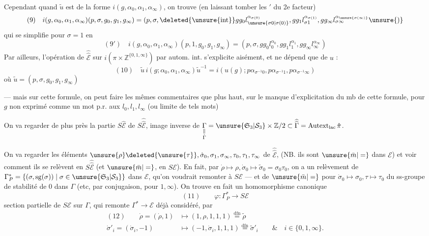 Cependant quand $\tilde u$ est de la forme $i(g,\alpha_0,\alpha_1,\alpha_\infty)$, on trouve (en laissant tomber les $'$ du 2e facteur)
\[
(9)\quad i(g,\alpha_0,\alpha_1,\alpha_\infty)(p,\sigma,g_0,g_1,g_\infty)=(p,\sigma,\deleted{\unsure{\operatorname{int}}}gg_0l_{\unsure{\sigma0|\sigma(0)}}^{\alpha_{\sigma(0)}},gg_1l_{\sigma1}^{\alpha_{\sigma(1)}},gg_\infty l_{\sigma\infty}^{\alpha_{\unsure{\sigma(\infty)}}}\unsure{)}
\]
qui se simplifie pour $\sigma=1$ en
\[
(9')\quad i(g,\alpha_0,\alpha_1,\alpha_\infty)(p,1,g_0,g_1,g_\infty)=(p,\sigma,gg_0l_0^{\alpha_0},gg_1l_1^{\alpha_1},gg_\infty l_\infty^{\alpha_\infty})
\]
Par ailleurs, l'opération de $\widehat{\widehat{\mathcal E}}$ sur $i(\pi\times\mathbb Z^{\{0,1,\infty\}})$ par autom. int. s'explicite aisément, et ne dépend que de $u$ :
\[
(10)\quad\tilde u\,i(g;\alpha_0,\alpha_1,\alpha_\infty)\tilde u^{-1}=i(u(g);p\alpha_{\sigma^{-1}0},p\alpha_{\sigma^{-1}1},p\alpha_{\sigma^{-1}\infty})
\]
où $\tilde u=(p,\sigma,g_0,g_1,g_\infty)$

--- mais sur cette formule, on peut faire les mêmes commentaires que plus haut, sur le manque d'explicitation du  mb de cette formule, pour $g$ non exprimé comme un mot p.r. aux $l_0,l_1,l_\infty$ (ou limite de tels mots)

On va regarder de plus près la partie $S\hat{\mathcal E}$ de $S\widehat{\widehat{\mathcal E}}$, image inverse de
$\underset{\substack{\Vert\\\hat\Gamma}}{\Gamma}=\unsure{\mathfrak S_3|\mathcal S_3}\times\mathbb Z/2\subset\widehat{\widehat\Gamma}=\operatorname{Autext}_{\mathrm{lac}}\hat\pi$.

On va regarder les éléments $\unsure{\rho}\deleted{\unsure{\tau}},\dot\sigma_0,\sigma_1,\sigma_\infty,\tau_0,\tau_1,\tau_\infty$ de $\widehat{\widehat{\mathcal E}}$,  (NB. ils sont $\unsure{\bar m|=}$ dans $\mathcal E$) et voir comment ils se relèvent en $S\widehat{\widehat{\mathcal E}}$ (et $\unsure{\bar m|=}$, en $S\mathcal E$). En fait, par $\dot\rho\mapsto\rho,\dot\sigma_0\mapsto\tilde\sigma_0=\sigma_0\tau_0$, on a un relèvement  de $\Gamma_P^*=\{(\sigma,\operatorname{sg}(\sigma))\mid\sigma\in\unsure{\mathfrak S_3|\mathcal S_3}\}$ dans $\mathcal E$, qu'on voudrait remonter à $S\mathcal E$ --- et de $\unsure{\bar m|=}$ pour $\dot\sigma_0\mapsto\sigma_0,\tau\mapsto\tau_0$ du ss-groupe de stabilité de $0$ dans $\Gamma$ (etc, par conjugaison,  pour $1,\infty$). On trouve en fait un homomorphisme canonique
\[
(11)\qquad\varphi:\Gamma_P^*\longrightarrow S\mathcal E
\]
 section partielle de $S\mathcal E$ sur $\Gamma$, qui remonte $\Gamma^*\to\mathcal E$ déjà considéré, par
\[
\begin{aligned}
(12)\qquad \dot\rho=(\dot\rho,1)&\longmapsto(1,\rho,1,1,1)\overset{\mathrm{dfn}}{=}\tilde\rho\\
\dot\sigma'_i=(\dot\sigma_i,-1)&\longmapsto(-1,\dot\sigma_i,1,1,1)\overset{\mathrm{dfn}}{=}\tilde\sigma'_i\qquad\&\quad i\in\{0,1,\infty\}.
\end{aligned}
\]

